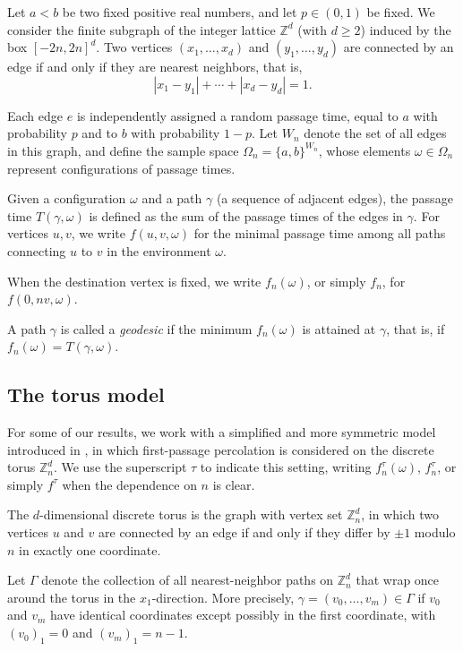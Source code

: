 \documentclass[reqno]{amsart}
\begin{document}
Let \( a < b \) be two fixed positive real numbers, and let \( p \in (0,1) \) be fixed. We consider the finite subgraph of the integer lattice \( \mathbb{Z}^d \) (with \( d \geq 2 \)) induced by the box \( [-2n,2n]^d \). Two vertices \( (x_1,\dots,x_d) \) and \( (y_1,\dots,y_d) \) are connected by an edge if and only if they are nearest neighbors, that is,
\[
|x_1-y_1| + \cdots + |x_d-y_d| = 1.
\]

Each edge \( e \) is independently assigned a random passage time, equal to \( a \) with probability \( p \) and to \( b \) with probability \( 1-p \). Let \( W_n \) denote the set of all edges in this graph, and define the sample space \( \Omega_n = \{a,b\}^{W_n} \), whose elements \( \omega \in \Omega_n \) represent configurations of passage times.

Given a configuration \( \omega \) and a path \( \gamma \) (a sequence of adjacent edges), the passage time \( T(\gamma,\omega) \) is defined as the sum of the passage times of the edges in \( \gamma \). For vertices \( u,v \), we write \( f(u,v,\omega) \) for the minimal passage time among all paths connecting \( u \) to \( v \) in the environment \( \omega \).

When the destination vertex is fixed, we write \( f_n(\omega) \), or simply \( f_n \), for \( f(0,nv,\omega) \).

A path \( \gamma \) is called a \emph{geodesic} if the minimum \( f_n(\omega) \) is attained at \( \gamma \), that is, if \( f_n(\omega) = T(\gamma,\omega) \).

\subsection{The torus model}

For some of our results, we work with a simplified and more symmetric model introduced in \cite{benjamini2006}, in which first-passage percolation is considered on the discrete torus \( \mathbb{Z}_n^d \). We use the superscript \( \tau \) to indicate this setting, writing \( f_n^{\tau}(\omega) \), \( f_n^{\tau} \), or simply \( f^{\tau} \) when the dependence on \( n \) is clear.

The \( d \)-dimensional discrete torus is the graph with vertex set \( \mathbb{Z}_n^d \), in which two vertices \( u \) and \( v \) are connected by an edge if and only if they differ by \( \pm 1 \) modulo \( n \) in exactly one coordinate.

Let \( \Gamma \) denote the collection of all nearest-neighbor paths on \( \mathbb{Z}_n^d \) that wrap once around the torus in the \( x_1 \)-direction. More precisely, \( \gamma=(v_0,\dots,v_m)\in\Gamma \) if \( v_0 \) and \( v_m \) have identical coordinates except possibly in the first coordinate, with \( (v_0)_1=0 \) and \( (v_m)_1=n-1 \).
\end{document}
